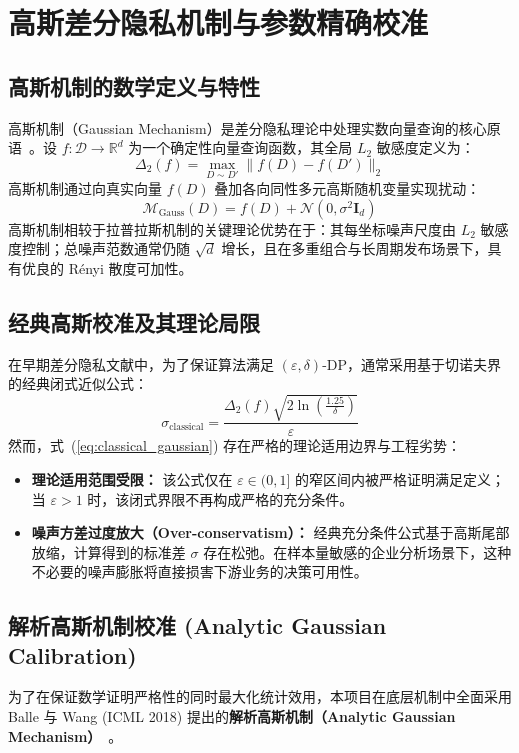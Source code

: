 \section{高斯差分隐私机制与参数精确校准}
\label{sec:gaussian}

\subsection{高斯机制的数学定义与特性}
高斯机制（Gaussian Mechanism）是差分隐私理论中处理实数向量查询的核心原语~\cite{dwork2006calibrating, dwork2014algorithmic}。设 $f: \mathcal{D} \to \mathbb{R}^d$ 为一个确定性向量查询函数，其全局 $L_2$ 敏感度定义为：
\begin{equation}
  \Delta_2(f) = \max_{D \sim D'} \|f(D) - f(D')\|_2
\end{equation}
高斯机制通过向真实向量 $f(D)$ 叠加各向同性多元高斯随机变量实现扰动：
\begin{equation}
  \mathcal{M}_{\text{Gauss}}(D) = f(D) + \mathcal{N}\left(0, \sigma^2 \mathbf{I}_d\right)
\end{equation}
高斯机制相较于拉普拉斯机制的关键理论优势在于：其每坐标噪声尺度由 $L_2$ 敏感度控制；总噪声范数通常仍随 $\sqrt d$ 增长，且在多重组合与长周期发布场景下，具有优良的 Rényi 散度可加性。

\subsection{经典高斯校准及其理论局限}
在早期差分隐私文献中，为了保证算法满足 $(\varepsilon, \delta)$-DP，通常采用基于切诺夫界的经典闭式近似公式：
\begin{equation}
  \label{eq:classical_gaussian}
  \sigma_{\text{classical}} = \frac{\Delta_2(f) \sqrt{2 \ln\left(\frac{1.25}{\delta}\right)}}{\varepsilon}
\end{equation}
然而，式~(\ref{eq:classical_gaussian}) 存在严格的理论适用边界与工程劣势：
\begin{itemize}[leftmargin=2em]
  \item \textbf{理论适用范围受限：} 该公式仅在 $\varepsilon \in (0, 1]$ 的窄区间内被严格证明满足定义；当 $\varepsilon > 1$ 时，该闭式界限不再构成严格的充分条件。
  \item \textbf{噪声方差过度放大（Over-conservatism）：} 经典充分条件公式基于高斯尾部放缩，计算得到的标准差 $\sigma$ 存在松弛。在样本量敏感的企业分析场景下，这种不必要的噪声膨胀将直接损害下游业务的决策可用性。
\end{itemize}

\subsection{解析高斯机制校准 (Analytic Gaussian Calibration)}
为了在保证数学证明严格性的同时最大化统计效用，本项目在底层机制中全面采用 Balle 与 Wang (ICML 2018) 提出的\textbf{解析高斯机制（Analytic Gaussian Mechanism）}~\cite{balle2018improving}。

